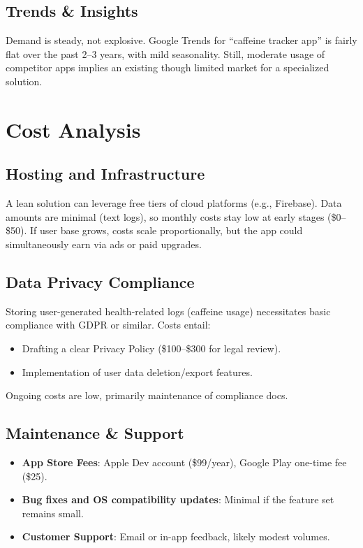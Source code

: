 \documentclass[12pt]{article}
\begin{document}
\subsection{Trends \& Insights}
Demand is steady, not explosive. Google Trends for “caffeine tracker app” is fairly 
flat over the past 2--3 years, with mild seasonality. 
Still, moderate usage of competitor apps implies an existing though limited market 
for a specialized solution.

\section{Cost Analysis}

\subsection{Hosting and Infrastructure}
A lean solution can leverage free tiers of cloud platforms (e.g., Firebase). 
Data amounts are minimal (text logs), so monthly costs stay low at early stages 
(\$0--\$50). If user base grows, costs scale proportionally, but the app could 
simultaneously earn via ads or paid upgrades.

\subsection{Data Privacy Compliance}
Storing user-generated health-related logs (caffeine usage) necessitates basic 
compliance with GDPR or similar. Costs entail:
\begin{itemize}[leftmargin=2em]
    \item Drafting a clear Privacy Policy (\$100--\$300 for legal review).
    \item Implementation of user data deletion/export features.
\end{itemize}
Ongoing costs are low, primarily maintenance of compliance docs.

\subsection{Maintenance \& Support}
\begin{itemize}[leftmargin=2em]
    \item \textbf{App Store Fees}: Apple Dev account (\$99/year), Google Play 
    one-time fee (\$25).  
    \item \textbf{Bug fixes and OS compatibility updates}: Minimal if the feature 
    set remains small.  
    \item \textbf{Customer Support}: Email or in-app feedback, likely modest volumes.
\end{itemize}
\end{document}
